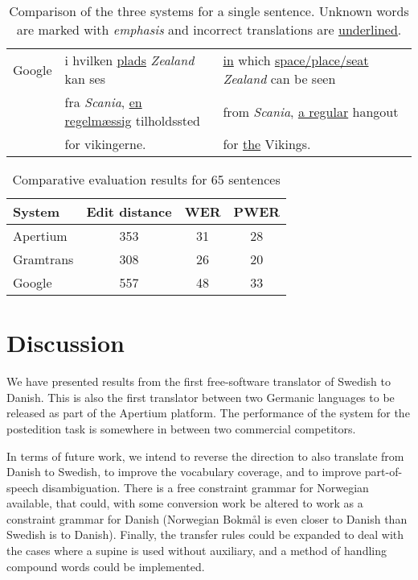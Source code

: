 \documentclass[11pt]{article}
\begin{document}
\begin{table*}
\begin{tabular}{|c|l|l|}
Google     & i hvilken \underline{plads} \emph{Zealand} kan ses           & \underline{in} which \underline{space/place/seat} \emph{Zealand} can be seen \\ 
~          & fra \emph{Scania}, \underline{en regelmæssig} tilholdssted   & from \emph{Scania}, \underline{a regular} hangout \\
~          & for vikingerne.                                  & for \underline{the} Vikings. \\
\hline 
\end{tabular}
 \label{table:extranslations}
 \caption{Comparison of the three systems for a single sentence. Unknown words are marked with \emph{emphasis} and
     incorrect translations are \underline{underlined}.}
\end{table*}

\begin{table}
\centering
\begin{tabular}{|l|c|c|c|}
\hline
System & Edit distance & WER & PWER\\
\hline
Apertium  & 353   & 31    & 28 \\
Gramtrans & 308   & 26    & 20 \\
Google    & 557   & 48    & 33 \\
\hline
\end{tabular}
    \caption{Comparative evaluation results for 65 sentences}
    \label{table:compeval}
\end{table}

\section{Discussion}

We have presented results from the first free-software translator of Swedish to Danish. This
is also the first translator between two Germanic languages to be released as part of the 
Apertium platform. The performance of the system for the postedition task is somewhere in between 
two commercial competitors. 

In terms of future work, we intend to reverse the direction to also translate from Danish to 
Swedish, to improve the vocabulary coverage, and to improve part-of-speech disambiguation. There
is a free constraint grammar for Norwegian \citep{hagen2000cbt} available, that could, with some
conversion work be altered to work as a constraint grammar for Danish (Norwegian Bokmål is even
closer to Danish than Swedish is to Danish). Finally, the transfer rules could be expanded to 
deal with the cases where a supine is used without auxiliary, and a method of handling compound
words could be implemented.
\end{document}

